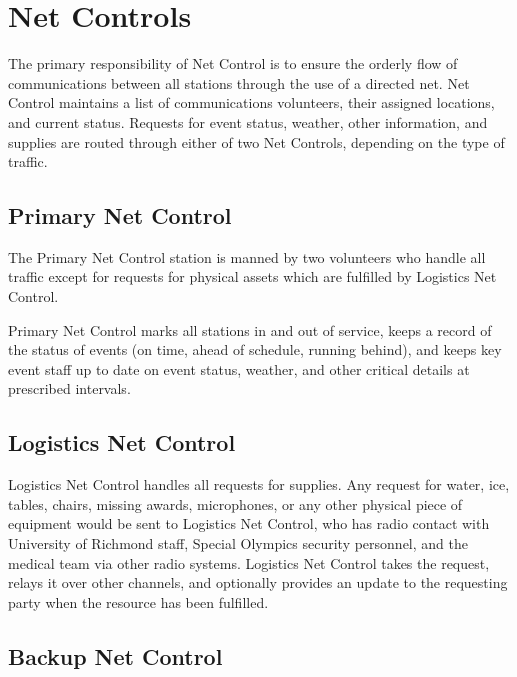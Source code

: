 \documentclass[pdflatex,letterpaper,twoside,12pt]{book}
\begin{document}

\section{Net Controls}

The primary responsibility of Net Control is to ensure the orderly flow of communications between all stations through the use of a directed net.  Net Control maintains a list of communications volunteers, their assigned locations, and current status.  Requests for event status, weather, other information, and supplies are routed through either of two Net Controls, depending on the type of traffic.

\subsection{Primary Net Control}

The Primary Net Control station is manned by two volunteers who handle all traffic except for requests for physical assets which are fulfilled by Logistics Net Control.

Primary Net Control marks all stations in and out of service, keeps a record of the status of events (on time, ahead of schedule, running behind), and keeps key event staff up to date on event status, weather, and other critical details at prescribed intervals.

\subsection{Logistics Net Control}

Logistics Net Control handles all requests for supplies.  Any request for water, ice, tables, chairs, missing awards, microphones, or any other physical piece of equipment would be sent to Logistics Net Control, who has radio contact with University of Richmond staff, Special Olympics security personnel, and the medical team via other radio systems.  Logistics Net Control takes the request, relays it over other channels, and optionally provides an update to the requesting party when the resource has been fulfilled.

\subsection{Backup Net Control}
\end{document}
